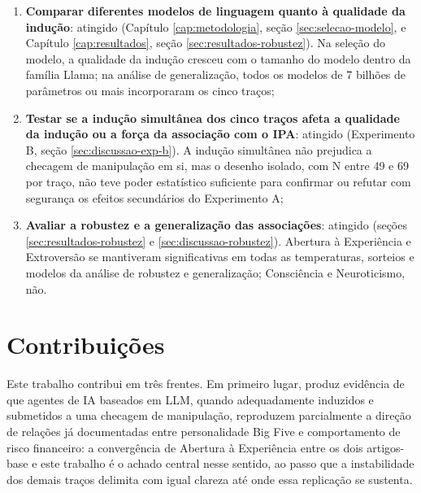 \begin{enumerate}
    Consciência e Neuroticismo, além de divergirem dos dois artigos-base,
    mostraram-se instáveis, o que impede tratar essa divergência como um
    achado substantivo;
    \item \textbf{Comparar diferentes modelos de linguagem quanto à
    qualidade da indução}: atingido (Capítulo \ref{cap:metodologia}, seção
    \ref{sec:selecao-modelo}, e Capítulo \ref{cap:resultados}, seção
    \ref{sec:resultados-robustez}). Na seleção do modelo, a qualidade da
    indução cresceu com o tamanho do modelo dentro da família Llama; na
    análise de generalização, todos os modelos de 7 bilhões de parâmetros
    ou mais incorporaram os cinco traços;
    \item \textbf{Testar se a indução simultânea dos cinco traços afeta a
    qualidade da indução ou a força da associação com o IPA}: atingido
    (Experimento B, seção \ref{sec:discussao-exp-b}). A indução simultânea
    não prejudica a checagem de manipulação em si, mas o desenho isolado,
    com N entre 49 e 69 por traço, não teve poder estatístico suficiente
    para confirmar ou refutar com segurança os efeitos secundários do
    Experimento A;
    \item \textbf{Avaliar a robustez e a generalização das associações}:
    atingido (seções \ref{sec:resultados-robustez} e
    \ref{sec:discussao-robustez}). Abertura à Experiência e Extroversão se
    mantiveram significativas em todas as temperaturas, sorteios e modelos
    da análise de robustez e generalização; Consciência e Neuroticismo,
    não.
\end{enumerate}

\section{Contribuições}

Este trabalho contribui em três frentes. Em primeiro lugar, produz
evidência de que agentes de IA baseados em LLM, quando adequadamente
induzidos e submetidos a uma checagem de manipulação, reproduzem
parcialmente a direção de relações já documentadas entre personalidade
Big Five e comportamento de risco financeiro: a convergência de Abertura
à Experiência entre os dois artigos-base e este trabalho é o achado
central nesse sentido, ao passo que a instabilidade dos demais traços
delimita com igual clareza até onde essa replicação se sustenta.

